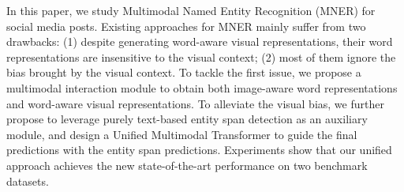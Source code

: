 In this paper, we study Multimodal Named Entity Recognition (MNER) for social media posts. Existing approaches for MNER mainly suffer from two drawbacks: (1) despite generating word-aware visual representations, their word representations are insensitive to the visual context; (2) most of them ignore the bias brought by the visual context. To tackle the first issue, we propose a multimodal interaction module to obtain both image-aware word representations and word-aware visual representations. To alleviate the visual bias, we further propose to leverage purely text-based entity span detection as an auxiliary module, and design a Unified Multimodal Transformer to guide the final predictions with the entity span predictions. Experiments show that our unified approach achieves the new state-of-the-art performance on two benchmark datasets.
